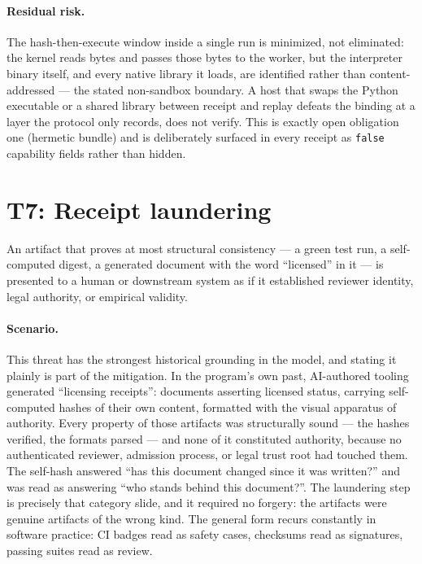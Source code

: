 \paragraph{Residual risk.} The hash-then-execute window inside a single run is minimized, not eliminated: the kernel reads bytes and passes those bytes to the worker, but the interpreter binary itself, and every native library it loads, are identified rather than content-addressed --- the stated non-sandbox boundary. A host that swaps the Python executable or a shared library between receipt and replay defeats the binding at a layer the protocol only records, does not verify. This is exactly open obligation one (hermetic bundle) and is deliberately surfaced in every receipt as \texttt{false} capability fields rather than hidden.

\section{T7: Receipt laundering}\label{threat:t7}

\begin{threat}\label{threat:thr:launder}
An artifact that proves at most structural consistency --- a green test run, a self-computed digest, a generated document with the word ``licensed'' in it --- is presented to a human or downstream system as if it established reviewer identity, legal authority, or empirical validity.
\end{threat}

\paragraph{Scenario.} This threat has the strongest historical grounding in the model, and stating it plainly is part of the mitigation. In the program's own past, AI-authored tooling generated ``licensing receipts'': documents asserting licensed status, carrying self-computed hashes of their own content, formatted with the visual apparatus of authority. Every property of those artifacts was structurally sound --- the hashes verified, the formats parsed --- and none of it constituted authority, because no authenticated reviewer, admission process, or legal trust root had touched them. The self-hash answered ``has this document changed since it was written?'' and was read as answering ``who stands behind this document?''. The laundering step is precisely that category slide, and it required no forgery: the artifacts were genuine artifacts of the wrong kind. The general form recurs constantly in software practice: CI badges read as safety cases, checksums read as signatures, passing suites read as review.

